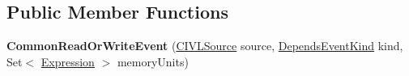 \subsection*{Public Member Functions}
\begin{DoxyCompactItemize}
\item 
\hypertarget{classedu_1_1udel_1_1cis_1_1vsl_1_1civl_1_1model_1_1common_1_1contract_1_1CommonReadOrWriteEvent_a182897dc1c43372472a7df9e6df5b32f}{}{\bfseries Common\+Read\+Or\+Write\+Event} (\hyperlink{interfaceedu_1_1udel_1_1cis_1_1vsl_1_1civl_1_1model_1_1IF_1_1CIVLSource}{C\+I\+V\+L\+Source} source, \hyperlink{enumedu_1_1udel_1_1cis_1_1vsl_1_1civl_1_1model_1_1IF_1_1contract_1_1DependsEvent_1_1DependsEventKind}{Depends\+Event\+Kind} kind, Set$<$ \hyperlink{interfaceedu_1_1udel_1_1cis_1_1vsl_1_1civl_1_1model_1_1IF_1_1expression_1_1Expression}{Expression} $>$ memory\+Units)\label{classedu_1_1udel_1_1cis_1_1vsl_1_1civl_1_1model_1_1common_1_1contract_1_1CommonReadOrWriteEvent_a182897dc1c43372472a7df9e6df5b32f}


\end{DoxyCompactItemize}
